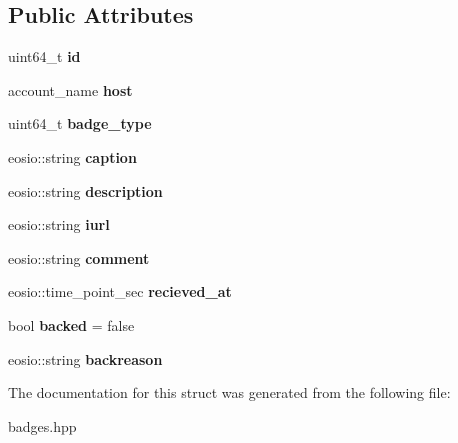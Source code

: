 \subsection*{Public Attributes}
\begin{DoxyCompactItemize}
\item 
\mbox{\label{structeosio_1_1usbadges_a1c3f9c15745c491f581dfe220c8b0836}} 
uint64\+\_\+t {\bfseries id}
\item 
\mbox{\label{structeosio_1_1usbadges_a38bac4b28a51306b00fca9a987f7b8ed}} 
account\+\_\+name {\bfseries host}
\item 
\mbox{\label{structeosio_1_1usbadges_aaad08f86c6d530851266d574bea00bb0}} 
uint64\+\_\+t {\bfseries badge\+\_\+type}
\item 
\mbox{\label{structeosio_1_1usbadges_a4473d8550fcc7dcb0b4ce36cf50f9780}} 
eosio\+::string {\bfseries caption}
\item 
\mbox{\label{structeosio_1_1usbadges_ade0c25ea48fd7d4a2404d305d0c44138}} 
eosio\+::string {\bfseries description}
\item 
\mbox{\label{structeosio_1_1usbadges_a469996cf77d33b5fb5b6befbe27e9446}} 
eosio\+::string {\bfseries iurl}
\item 
\mbox{\label{structeosio_1_1usbadges_a33f9796364181ec39ed3a931f3aa694a}} 
eosio\+::string {\bfseries comment}
\item 
\mbox{\label{structeosio_1_1usbadges_a9149d3a9abaf9ea7e10d9937033cb79d}} 
eosio\+::time\+\_\+point\+\_\+sec {\bfseries recieved\+\_\+at}
\item 
\mbox{\label{structeosio_1_1usbadges_a86466d8cb7eac5bd731a377b5147fe1b}} 
bool {\bfseries backed} = false
\item 
\mbox{\label{structeosio_1_1usbadges_a280fd395d00e11639d2c8cd56ca9475d}} 
eosio\+::string {\bfseries backreason}
\end{DoxyCompactItemize}


The documentation for this struct was generated from the following file\+:\begin{DoxyCompactItemize}
\item 
badges.\+hpp\end{DoxyCompactItemize}
